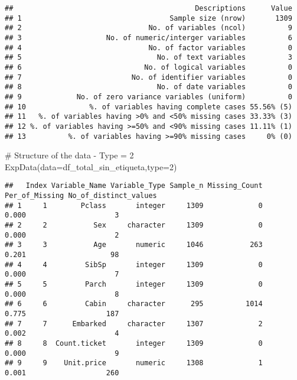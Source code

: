\documentclass[
]{article}
\newenvironment{Shaded}{\begin{snugshade}}{\end{snugshade}}
\newcommand{\CommentTok}[1]{\textcolor[rgb]{0.50,0.62,0.50}{#1}}
\newcommand{\DataTypeTok}[1]{\textcolor[rgb]{0.87,0.87,0.75}{#1}}
\newcommand{\DecValTok}[1]{\textcolor[rgb]{0.86,0.86,0.80}{#1}}
\newcommand{\KeywordTok}[1]{\textcolor[rgb]{0.94,0.87,0.69}{#1}}
\newcommand{\NormalTok}[1]{\textcolor[rgb]{0.80,0.80,0.80}{#1}}
\begin{document}
\begin{verbatim}
##                                           Descriptions      Value
## 1                                   Sample size (nrow)       1309
## 2                              No. of variables (ncol)          9
## 3                    No. of numeric/interger variables          6
## 4                              No. of factor variables          0
## 5                                No. of text variables          3
## 6                             No. of logical variables          0
## 7                          No. of identifier variables          0
## 8                                No. of date variables          0
## 9             No. of zero variance variables (uniform)          0
## 10               %. of variables having complete cases 55.56% (5)
## 11   %. of variables having >0% and <50% missing cases 33.33% (3)
## 12 %. of variables having >=50% and <90% missing cases 11.11% (1)
## 13          %. of variables having >=90% missing cases     0% (0)
\end{verbatim}

\begin{Shaded}
\begin{Highlighting}[]
\CommentTok{# Structure of the data - Type = 2}
\KeywordTok{ExpData}\NormalTok{(}\DataTypeTok{data=}\NormalTok{df_total_sin_etiqueta,}\DataTypeTok{type=}\DecValTok{2}\NormalTok{)}
\end{Highlighting}
\end{Shaded}

\begin{verbatim}
##   Index Variable_Name Variable_Type Sample_n Missing_Count Per_of_Missing No_of_distinct_values
## 1     1        Pclass       integer     1309             0          0.000                     3
## 2     2           Sex     character     1309             0          0.000                     2
## 3     3           Age       numeric     1046           263          0.201                    98
## 4     4         SibSp       integer     1309             0          0.000                     7
## 5     5         Parch       integer     1309             0          0.000                     8
## 6     6         Cabin     character      295          1014          0.775                   187
## 7     7      Embarked     character     1307             2          0.002                     4
## 8     8  Count.ticket       integer     1309             0          0.000                     9
## 9     9    Unit.price       numeric     1308             1          0.001                   260
\end{verbatim}
\end{document}
